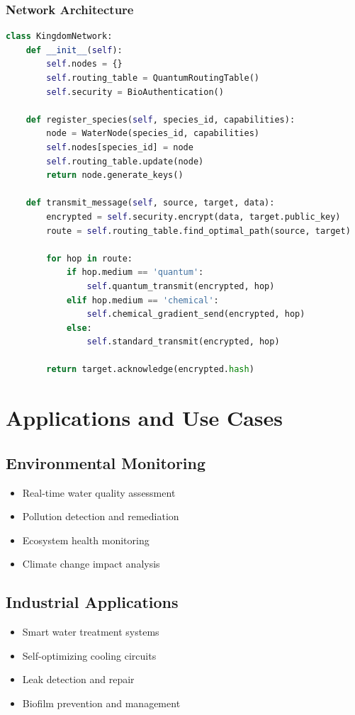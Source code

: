 \documentclass[11pt,a4paper]{article}
\begin{document}
\subsubsection{Network Architecture}
\begin{lstlisting}[language=Python, caption=Kingdom Network Protocol]
class KingdomNetwork:
    def __init__(self):
        self.nodes = {}
        self.routing_table = QuantumRoutingTable()
        self.security = BioAuthentication()
    
    def register_species(self, species_id, capabilities):
        node = WaterNode(species_id, capabilities)
        self.nodes[species_id] = node
        self.routing_table.update(node)
        return node.generate_keys()
    
    def transmit_message(self, source, target, data):
        encrypted = self.security.encrypt(data, target.public_key)
        route = self.routing_table.find_optimal_path(source, target)
        
        for hop in route:
            if hop.medium == 'quantum':
                self.quantum_transmit(encrypted, hop)
            elif hop.medium == 'chemical':
                self.chemical_gradient_send(encrypted, hop)
            else:
                self.standard_transmit(encrypted, hop)
        
        return target.acknowledge(encrypted.hash)
\end{lstlisting}

\section{Applications and Use Cases}
\label{sec:applications}

\subsection{Environmental Monitoring}
\begin{itemize}
    \item Real-time water quality assessment
    \item Pollution detection and remediation
    \item Ecosystem health monitoring
    \item Climate change impact analysis
\end{itemize}

\subsection{Industrial Applications}
\begin{itemize}
    \item Smart water treatment systems
    \item Self-optimizing cooling circuits
    \item Leak detection and repair
    \item Biofilm prevention and management
\end{itemize}
\end{document}
